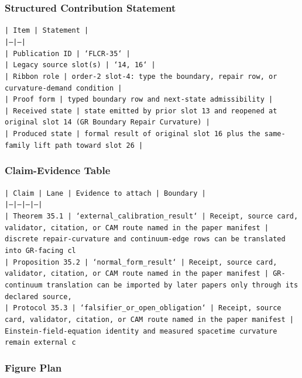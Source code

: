 \documentclass[11pt]{article}
\begin{document}
\subsubsection*{Structured Contribution Statement}

\noindent\texttt{| Item | Statement |}\\
\noindent\texttt{|---|---|}\\
\noindent\texttt{| Publication ID | `FLCR-35` |}\\
\noindent\texttt{| Legacy source slot(s) | `14, 16` |}\\
\noindent\texttt{| Ribbon role | order-2 slot-4: type the boundary, repair row, or curvature-demand condition |}\\
\noindent\texttt{| Proof form | typed boundary row and next-state admissibility |}\\
\noindent\texttt{| Received state | state emitted by prior slot 13 and reopened at original slot 14 (GR Boundary Repair Curvature) |}\\
\noindent\texttt{| Produced state | formal result of original slot 16 plus the same-family lift path toward slot 26 |}\\

\subsubsection*{Claim-Evidence Table}

\noindent\texttt{| Claim | Lane | Evidence to attach | Boundary |}\\
\noindent\texttt{|---|---|---|---|}\\
\noindent\texttt{| Theorem 35.1 | `external\_calibration\_result` | Receipt, source card, validator, citation, or CAM route named in the paper manifest | discrete repair-curvature and continuum-edge rows can be translated into GR-facing cl}\\
\noindent\texttt{| Proposition 35.2 | `normal\_form\_result` | Receipt, source card, validator, citation, or CAM route named in the paper manifest | GR-continuum translation can be imported by later papers only through its declared source,}\\
\noindent\texttt{| Protocol 35.3 | `falsifier\_or\_open\_obligation` | Receipt, source card, validator, citation, or CAM route named in the paper manifest | Einstein-field-equation identity and measured spacetime curvature remain external c}\\

\subsubsection*{Figure Plan}
\end{document}
